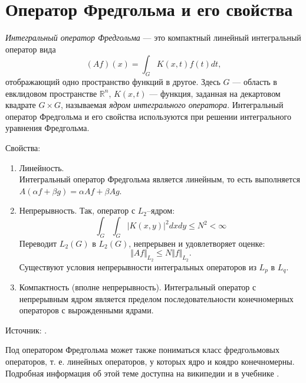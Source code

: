 \section{Оператор Фредгольма и его свойства}
\label{sec:q-31}
\textit{Интегральный оператор Фредгольма} --- это компактный линейный интегральный оператор вида
$$(Af)(x) = \int_{G} K(x, t) f(t) dt,$$
отображающий одно пространство функций в другое. Здесь $G$ --- область в евклидовом пространстве $\mathbb{R}^n$, $K(x, t)$ --- функция, заданная на декартовом квадрате $G \times G$, называемая \textit{ядром интегрального оператора}. Интегральный оператор Фредгольма и его свойства используются при решении интегрального уравнения Фредгольма.

Свойства:
\begin{enumerate}
	\itemsep0pt
	\item Линейность.\\
	Интегральный оператор Фредгольма является линейным, то есть выполняется $A(\alpha f + \beta g) = \alpha A f + \beta A g$.
	\item Непрерывность.
	Так, оператор с $L_2$--ядром:
	$$\int_G\int_G |K(x, y)|^2 dx dy \leqslant N^2 < \infty$$
	Переводит $L_2(G)$ в $L_2(G)$, непрерывен и удовлетворяет оценке:
	$$\Vert Af\Vert_{L_2} \leqslant N\Vert f \Vert_{L_2}.$$
	Существуют условия непрерывности интегральных операторов из $L_{p}$ в ${\displaystyle L_{q}}$.
	\item Компактность (вполне непрерывность).
	Интегральный оператор с непрерывным ядром является пределом последовательности конечномерных операторов с вырожденными ядрами.
\end{enumerate}
Источник: \cite{fredholm-integral-operator}.

Под оператором Фредгольма может также пониматься класс фредгольмовых операторов, т. е. линейных операторов, у которых ядро и коядро конечномерны.\\
Подробная информация об этой теме доступна на википедии \cite{fredholm-operator} и в учебнике \cite[с.~219]{trenogin}.
